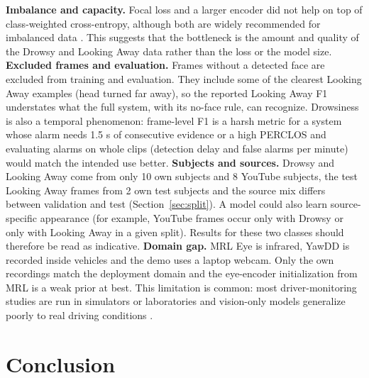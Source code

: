 \documentclass[conference]{IEEEtran}
\begin{document}
\newline
\textbf{Imbalance and capacity.} Focal loss and a larger encoder did not help on top of class-weighted cross-entropy, although both are widely recommended for imbalanced data \cite{lin2017,ghosh2024}. This suggests that the bottleneck is the amount and quality of the Drowsy and Looking Away data rather than the loss or the model size.
\newline
\textbf{Excluded frames and evaluation.} Frames without a detected face are excluded from training and evaluation. They include some of the clearest Looking Away examples (head turned far away), so the reported Looking Away F1 understates what the full system, with its no-face rule, can recognize. Drowsiness is also a temporal phenomenon: frame-level F1 is a harsh metric for a system whose alarm needs 1.5 s of consecutive evidence or a high PERCLOS and evaluating alarms on whole clips (detection delay and false alarms per minute) would match the intended use better.
\newline
\textbf{Subjects and sources.} Drowsy and Looking Away come from only 10 own subjects and 8 YouTube subjects, the test Looking Away frames from 2 own test subjects and the source mix differs between validation and test (Section~\ref{sec:split}). A model could also learn source-specific appearance (for example, YouTube frames occur only with Drowsy or only with Looking Away in a given split). Results for these two classes should therefore be read as indicative.
\newline
\textbf{Domain gap.} MRL Eye is infrared, YawDD is recorded inside vehicles and the demo uses a laptop webcam. Only the own recordings match the deployment domain and the eye-encoder initialization from MRL is a weak prior at best. This limitation is common: most driver-monitoring studies are run in simulators or laboratories \cite{john2024} and vision-only models generalize poorly to real driving conditions \cite{dontoh2025}.



\vspace{0.2cm}
\section{Conclusion}
\end{document}
